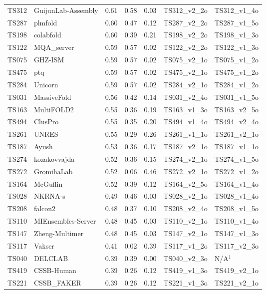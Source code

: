 \begin{longtable}{lllllll}
TS312 & GuijunLab-Assembly & 0.61 & 0.58 & 0.03 & TS312\_v2\_2o & TS312\_v1\_4o \\ 
TS287 & plmfold & 0.60 & 0.47 & 0.12 & TS287\_v2\_2o & TS287\_v1\_5o \\ 
TS198 & colabfold & 0.60 & 0.39 & 0.21 & TS198\_v2\_2o & TS198\_v1\_3o \\ 
TS122 & MQA\_server & 0.59 & 0.57 & 0.02 & TS122\_v2\_2o & TS122\_v1\_3o \\ 
TS075 & GHZ-ISM & 0.59 & 0.57 & 0.02 & TS075\_v2\_1o & TS075\_v1\_2o \\ 
TS475 & ptq & 0.59 & 0.57 & 0.02 & TS475\_v2\_1o & TS475\_v1\_2o \\ 
TS284 & Unicorn & 0.59 & 0.57 & 0.02 & TS284\_v2\_1o & TS284\_v1\_2o \\ 
TS031 & MassiveFold & 0.56 & 0.42 & 0.14 & TS031\_v2\_4o & TS031\_v1\_5o \\ 
TS163 & MultiFOLD2 & 0.55 & 0.36 & 0.19 & TS163\_v1\_3o & TS163\_v2\_5o \\ 
TS494 & ClusPro & 0.55 & 0.35 & 0.20 & TS494\_v1\_4o & TS494\_v2\_4o \\ 
TS261 & UNRES & 0.55 & 0.29 & 0.26 & TS261\_v1\_1o & TS261\_v2\_1o \\ 
TS187 & Ayush & 0.53 & 0.36 & 0.17 & TS187\_v2\_1o & TS187\_v1\_1o \\ 
TS274 & kozakovvajda & 0.52 & 0.36 & 0.15 & TS274\_v2\_1o & TS274\_v1\_5o \\ 
TS272 & GromihaLab & 0.52 & 0.06 & 0.46 & TS272\_v2\_1o & TS272\_v1\_2o \\ 
TS164 & McGuffin & 0.52 & 0.39 & 0.12 & TS164\_v2\_5o & TS164\_v1\_4o \\ 
TS028 & NKRNA-s & 0.49 & 0.46 & 0.03 & TS028\_v2\_1o & TS028\_v1\_4o \\ 
TS208 & falcon2 & 0.48 & 0.37 & 0.10 & TS208\_v2\_4o & TS208\_v1\_5o \\ 
TS110 & MIEnsembles-Server & 0.48 & 0.45 & 0.03 & TS110\_v2\_1o & TS110\_v1\_4o \\ 
TS147 & Zheng-Multimer & 0.48 & 0.45 & 0.03 & TS147\_v2\_1o & TS147\_v1\_3o \\ 
TS117 & Vakser & 0.41 & 0.02 & 0.39 & TS117\_v1\_2o & TS117\_v2\_3o \\ 
TS040 & DELCLAB & 0.39 & 0.39 & 0.00 & TS040\_v2\_3o & N/A$^{1}$ \\ 
TS419 & CSSB-Human & 0.39 & 0.26 & 0.12 & TS419\_v1\_3o & TS419\_v2\_1o \\ 
TS221 & CSSB\_FAKER & 0.39 & 0.26 & 0.12 & TS221\_v1\_3o & TS221\_v2\_1o \\ 

\end{longtable}
